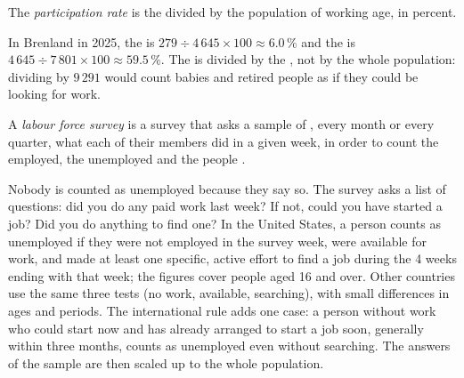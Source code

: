 \begin{definition}\label{def:g8:jobs-wages-unemployment:participation-rate}
The \emph{participation rate} is the  divided by the
population of working age, in percent.
\end{definition}

In Brenland in 2025, the  is $279 \div 4\,645 \times 100 \approx 6.0\,\%$ and the
 is $4\,645 \div 7\,801 \times 100 \approx 59.5\,\%$. The  is
divided by the , not by the whole population: dividing by $9\,291$ would count babies
and retired people as if they could be looking for work.

\begin{definition}\label{def:g8:jobs-wages-unemployment:survey}
A \emph{labour force survey} is a survey that asks a sample of
, every month or every quarter, what each of their members did in a given week, in order
to count the employed, the unemployed and the people .
\end{definition}

\begin{measure}
Nobody is counted as unemployed because they say so. The survey asks a list of questions: did you
do any paid work last week? If not, could you have started a job? Did you do anything to find one?
In the United States, a person counts as unemployed if they were not employed in the survey week,
were available for work, and made at least one specific, active effort to find a job during the
4 weeks ending with that week; the figures cover people aged 16 and over. Other countries use the
same three tests (no work, available, searching), with small differences in ages and periods. The
international rule adds one case: a person without work who could start now and has already arranged
to start a job soon, generally within three months, counts as unemployed even without searching. The
answers of the sample are then scaled up to the whole population.
\end{measure}

